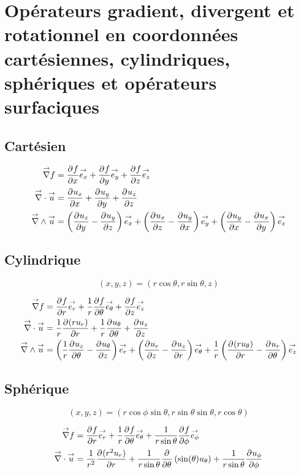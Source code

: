 \section{Opérateurs gradient, divergent et rotationnel en coordonnées cartésiennes, cylindriques, sphériques et opérateurs surfaciques}
\label{sec:annexe:div_grad_rot}
\subsection{Cartésien}

    \begin{align}
        \vgrad f &= \ddr{x}{f}\vect{e_x} + \ddr{y}{f}\vect{e_y}  + \ddr{z}{f}\vect{e_z} \\
        \vdiv \vu &= \ddr{x}{u_x} + \ddr{y}{u_y} + \ddr{z}{u_z} \\
        \vrot\vu &= \left(\ddr{y}{u_z}-\ddr{z}{u_y}\right)\vect{e_x} + \left(\ddr{z}{u_x}-\ddr{x}{u_y}\right)\vect{e_y} + \left(\ddr{x}{u_y}-\ddr{y}{u_x}\right)\vect{e_z}
    \end{align}

\subsection{Cylindrique}

    \[
        (x,y,z) = (r\cos\theta,r\sin\theta,z)
    \]

    \begin{align}
        \vgrad f &= \ddr{r}{f}\vect{e_r}
        +\frac{1}{r}\ddr{\theta}{f}\vect{e_\theta} + \ddr{z}{f}\vect{e_z}
        \\
        \vdiv \vu &= \frac{1}{r}\ddr{r}{(ru_r)}+\frac{1}{r}\ddr{\theta}{u_\theta}+\ddr{z}{u_z}
        \\
        \vrot \vu &= \left(\frac{1}{r}\ddr{\theta}{u_z} - \ddr{z}{u_\theta}\right)\vect{e_r} +
        \left(\ddr{z}{u_r} - \ddr{r}{u_z}\right)\vect{e_\theta} +
        \frac{1}{r}\left(\ddr{r}{(ru_\theta)}-\ddr{\theta}{u_r}\right)\vect{e_z}
    \end{align}

\subsection{Sphérique}

    \[
        (x,y,z) = (r\cos\phi\sin\theta,r\sin\theta\sin\theta,r\cos\theta)
    \]

    \begin{align}
        \vgrad f &= \ddr{r}{f}\vect{e_r}
        +\frac{1}{r}\ddr{\theta}{f}\vect{e_\theta} + \frac{1}{r\sin\theta}\ddr{\phi}{f}\vect{e_\phi}
        \\
        \vdiv \vu &= \frac{1}{r^2}\ddr{r}{(r^2u_r)}
        + \frac{1}{r\sin\theta}\ddr{\theta}{}\left(\sin(\theta)u_\theta\right) + \frac{1}{r\sin\theta}\ddr{\phi}{u_\phi}
    \end{align}

